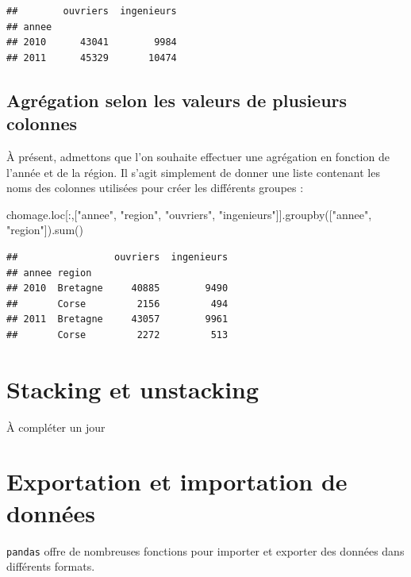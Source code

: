 \documentclass[
  12pt,
]{book}
\newenvironment{Shaded}{\begin{snugshade}}{\end{snugshade}}
\newcommand{\BuiltInTok}[1]{#1}
\newcommand{\NormalTok}[1]{#1}
\newcommand{\StringTok}[1]{\textcolor[rgb]{0.31,0.60,0.02}{#1}}
\numberwithin{equation}{section}
\numberwithin{countremarque}{section}
\begin{document}
\begin{lstlisting}
##        ouvriers  ingenieurs
## annee                      
## 2010      43041        9984
## 2011      45329       10474
\end{lstlisting}

\subsection{Agrégation selon les valeurs de plusieurs colonnes}\label{agruxe9gation-selon-les-valeurs-de-plusieurs-colonnes}

À présent, admettons que l'on souhaite effectuer une agrégation en fonction de l'année et de la région. Il s'agit simplement de donner une liste contenant les noms des colonnes utilisées pour créer les différents groupes :

\begin{Shaded}
\begin{Highlighting}[]
\NormalTok{chomage.loc[:,[}\StringTok{"annee"}\NormalTok{, }\StringTok{"region"}\NormalTok{,}
               \StringTok{"ouvriers"}\NormalTok{, }\StringTok{"ingenieurs"}\NormalTok{]].groupby([}\StringTok{"annee"}\NormalTok{,}
                                                   \StringTok{"region"}\NormalTok{]).}\BuiltInTok{sum}\NormalTok{()}
\end{Highlighting}
\end{Shaded}

\begin{lstlisting}
##                 ouvriers  ingenieurs
## annee region                        
## 2010  Bretagne     40885        9490
##       Corse         2156         494
## 2011  Bretagne     43057        9961
##       Corse         2272         513
\end{lstlisting}

\section{Stacking et unstacking}\label{stacking-et-unstacking}

À compléter un jour

\section{Exportation et importation de données}\label{exportation-et-importation-de-donnuxe9es}

\texttt{pandas} offre de nombreuses fonctions pour importer et exporter des données dans différents formats.
\end{document}

